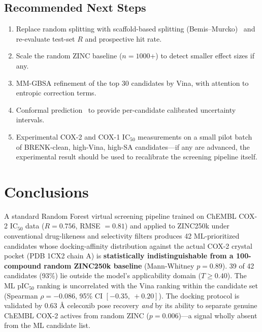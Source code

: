 \documentclass[11pt]{article}
\begin{document}
\subsection{Recommended Next Steps}

\begin{enumerate}
\item Replace random splitting with scaffold-based splitting (Bemis--Murcko)~\cite{martin2017} and re-evaluate test-set $R$ and prospective hit rate.

\item Scale the random ZINC baseline ($n = 1000$+) to detect smaller effect sizes if any.

\item MM-GBSA refinement of the top 30 candidates by Vina, with attention to entropic correction terms.

\item Conformal prediction~\cite{cortes2019} to provide per-candidate calibrated uncertainty intervals.

\item Experimental COX-2 and COX-1 IC$_{50}$ measurements on a small pilot batch of BRENK-clean, high-Vina, high-SA candidates---if any are advanced, the experimental result should be used to recalibrate the screening pipeline itself.
\end{enumerate}

\section{Conclusions}

A standard Random Forest virtual screening pipeline trained on ChEMBL COX-2 IC$_{50}$ data ($R = 0.756$, RMSE $= 0.81$) and applied to ZINC250k under conventional drug-likeness and selectivity filters produces 42 ML-prioritized candidates whose docking-affinity distribution against the actual COX-2 crystal pocket (PDB 1CX2 chain A) is \textbf{statistically indistinguishable from a 100-compound random ZINC250k baseline} (Mann-Whitney $p = 0.89$). 39 of 42 candidates (93\%) lie outside the model's applicability domain ($T \geq 0.40$). The ML pIC$_{50}$ ranking is uncorrelated with the Vina ranking within the candidate set (Spearman $\rho = -0.086$, 95\% CI $[-0.35,\ +0.20]$). The docking protocol is validated by 0.63 \r{A} celecoxib pose recovery \emph{and} by its ability to separate genuine ChEMBL COX-2 actives from random ZINC ($p = 0.006$)---a signal wholly absent from the ML candidate list.
\end{document}
